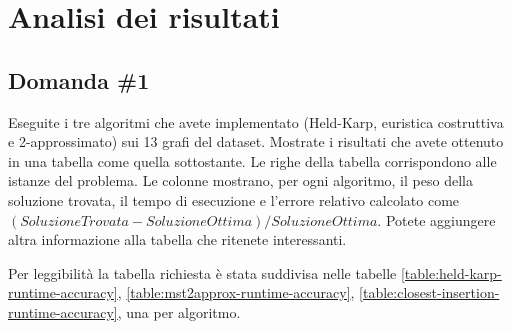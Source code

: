 \section{Analisi dei risultati}
\label{cap:performance-analysis}

\subsection{Domanda \#1}
\label{sec:question-1}

\begin{displayquote}
Eseguite i tre algoritmi che avete implementato (Held-Karp,
euristica costruttiva e 2-approssimato) sui 13 grafi del dataset.
Mostrate i risultati che avete ottenuto in una tabella come quella
sottostante. Le righe della tabella corrispondono alle istanze del
problema. Le colonne mostrano, per ogni algoritmo, il peso della
soluzione trovata, il tempo di esecuzione e l'errore relativo
calcolato come $(SoluzioneTrovata-SoluzioneOttima)/SoluzioneOttima$.
Potete aggiungere altra informazione alla tabella che ritenete
interessanti.
\end{displayquote}

Per leggibilità la tabella richiesta è stata suddivisa nelle tabelle
\ref{table:held-karp-runtime-accuracy},
\ref{table:mst2approx-runtime-accuracy},
\ref{table:closest-insertion-runtime-accuracy},
una per algoritmo.

